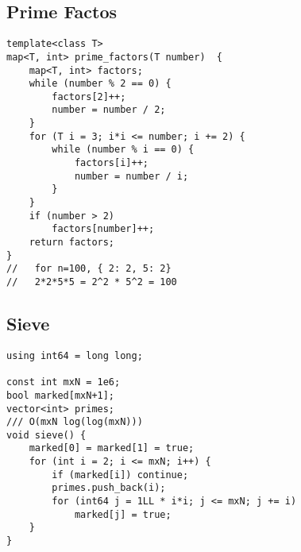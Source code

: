 \documentclass[10pt,letterpaper,twocolumn,twosided]{article}
\begin{document}
\subsection{Prime Factos}
\begin{lstlisting}
template<class T>
map<T, int> prime_factors(T number)  {
    map<T, int> factors;
    while (number % 2 == 0) {
        factors[2]++;
        number = number / 2;
    }
    for (T i = 3; i*i <= number; i += 2) {
        while (number % i == 0) {
            factors[i]++;
            number = number / i; 
        }
    }
    if (number > 2)
        factors[number]++;
    return factors;
}
//   for n=100, { 2: 2, 5: 2}
//   2*2*5*5 = 2^2 * 5^2 = 100
\end{lstlisting}

\subsection{Sieve}
\begin{lstlisting}
using int64 = long long;

const int mxN = 1e6;
bool marked[mxN+1];
vector<int> primes;
/// O(mxN log(log(mxN)))
void sieve() {
    marked[0] = marked[1] = true;
    for (int i = 2; i <= mxN; i++) {
        if (marked[i]) continue;
        primes.push_back(i);
        for (int64 j = 1LL * i*i; j <= mxN; j += i)
            marked[j] = true;
    }
}
\end{lstlisting}
\end{document}
